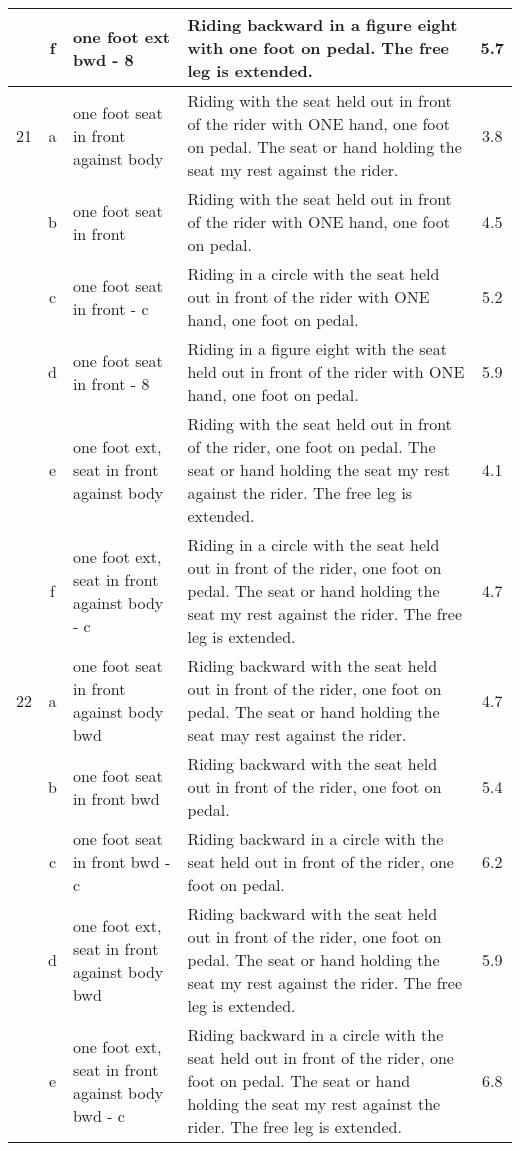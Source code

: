 \begin{longtable}{|r|c|p{4cm}|p{8cm}|c|}
\hline
  & f & one foot ext bwd - 8  & Riding backward in a figure eight with one foot on pedal. The free leg is extended. & 5.7 \\ 
\hline
21  & a & one foot seat in front against body & Riding with the seat held out in front of the rider with ONE hand, one foot on pedal. The seat or hand holding the seat my rest against the rider.  & 3.8 \\ 
\hline
  & b & one foot seat in front  & Riding with the seat held out in front of the rider with ONE hand, one foot on pedal. & 4.5 \\ 
\hline
  & c & one foot seat in front - c  & Riding in a circle with the seat held out in front of the rider with ONE hand, one foot on pedal. & 5.2 \\ 
\hline
  & d & one foot seat in front - 8  & Riding in a figure eight with the seat held out in front of the rider with ONE hand, one foot on pedal. & 5.9 \\ 
\hline
  & e & one foot ext, seat in front against body  & Riding with the seat held out in front of the rider, one foot on pedal. The seat or hand holding the seat my rest against the rider. The free leg is extended.  & 4.1 \\ 
\hline
  & f & one foot ext, seat in front against body - c  & Riding in a circle with the seat held out in front of the rider, one foot on pedal. The seat or hand holding the seat my rest against the rider. The free leg is extended.  & 4.7 \\ 
\hline
22  & a & one foot seat in front against body bwd & Riding backward with the seat held out in front of the rider, one foot on pedal. The seat or hand holding the seat may rest against the rider.  & 4.7 \\ 
\hline
  & b & one foot seat in front bwd  & Riding backward with the seat held out in front of the rider, one foot on pedal.  & 5.4 \\ 
\hline
  & c & one foot seat in front bwd - c  & Riding backward in a circle with the seat held out in front of the rider, one foot on pedal.  & 6.2 \\ 
\hline
  & d & one foot ext, seat in front against body bwd  & Riding backward with the seat held out in front of the rider, one foot on pedal. The seat or hand holding the seat my rest against the rider. The free leg is extended. & 5.9 \\ 
\hline
  & e & one foot ext, seat in front against body bwd - c  & Riding backward in a circle with the seat held out in front of the rider, one foot on pedal. The seat or hand holding the seat my rest against the rider. The free leg is extended. & 6.8 \\ 

\end{longtable}
